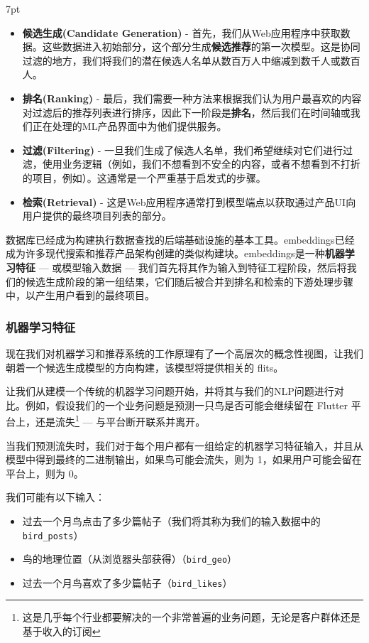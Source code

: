 \documentclass[Chinese, 11pt, table]{diazessay} %
\newenvironment{formal}{%
  \def\FrameCommand{%
	\hspace{1pt}%
	{\color{w_lightblue}\vrule width 2pt}%
	{\color{formalshade}\vrule width 4pt}%
	\colorbox{formalshade}%
  }%
  \MakeFramed{\advance\hsize-\width\FrameRestore}%
  \noindent\hspace{-4.55pt}%
  \begin{adjustwidth}{}{7pt}%
  \vspace{2pt}\vspace{2pt}%
}
{%
  \vspace{2pt}\end{adjustwidth}\endMakeFramed%
}
\begin{document}
\begin{CJK}{UTF8}{gbsn}
\begin{sloppypar}
\begin{formal}
\begin{itemize}
  \item \textbf{候选生成(Candidate Generation)} - 首先，我们从Web应用程序中获取数据。这些数据进入初始部分，这个部分生成\textbf{候选推荐}的第一次模型。这是协同过滤的地方，我们将我们的潜在候选人名单从数百万人中缩减到数千人或数百人。
  \item \textbf{排名(Ranking)} - 最后，我们需要一种方法来根据我们认为用户最喜欢的内容对过滤后的推荐列表进行排序，因此下一阶段是\textbf{排名}，然后我们在时间轴或我们正在处理的ML产品界面中为他们提供服务。
  \item \textbf{过滤(Filtering)} - 一旦我们生成了候选人名单，我们希望继续对它们进行过滤，使用业务逻辑（例如，我们不想看到不安全的内容，或者不想看到不打折的项目，例如）。这通常是一个严重基于启发式的步骤。
  \item \textbf{检索(Retrieval)} - 这是Web应用程序通常打到模型端点以获取通过产品UI向用户提供的最终项目列表的部分。
\end{itemize}
\end{formal}
    
数据库已经成为构建执行数据查找的后端基础设施的基本工具。embeddings已经成为许多现代搜索和推荐产品架构创建的类似构建块。embeddings是一种\textbf{机器学习特征} --- 或模型输入数据 --- 我们首先将其作为输入到特征工程阶段，然后将我们的候选生成阶段的第一组结果，它们随后被合并到排名和检索的下游处理步骤中，以产生用户看到的最终项目。

\subsubsection{机器学习特征}

现在我们对机器学习和推荐系统的工作原理有了一个高层次的概念性视图，让我们朝着一个候选生成模型的方向构建，该模型将提供相关的 flits。

让我们从建模一个传统的机器学习问题开始，并将其与我们的NLP问题进行对比。例如，假设我们的一个业务问题是预测一只鸟是否可能会继续留在 Flutter 平台上，还是流失\footnote{这是几乎每个行业都要解决的一个非常普遍的业务问题，无论是客户群体还是基于收入的订阅} --- 与平台断开联系并离开。

当我们预测流失时，我们对于每个用户都有一组给定的机器学习特征输入，并且从模型中得到最终的二进制输出，如果鸟可能会流失，则为 1，如果用户可能会留在平台上，则为 0。

我们可能有以下输入：

\begin{itemize}
  \item 过去一个月鸟点击了多少篇帖子（我们将其称为我们的输入数据中的 \texttt{bird_posts}）
  \item 鸟的地理位置（从浏览器头部获得）（\texttt{bird_geo}）
  \item 过去一个月鸟喜欢了多少篇帖子（\texttt{bird_likes}）
\end{itemize}


\end{sloppypar}
\end{CJK}
\end{document}
